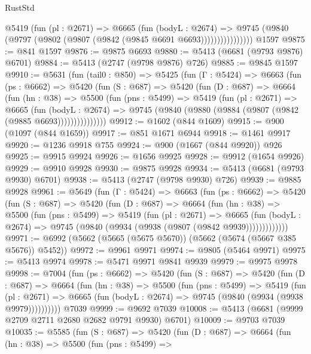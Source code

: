 \begin{lexlean}{RustStd}
\begin{coremodule}
                  @5419
                    (fun (pl : @2671) =>
                    @6665
                      (fun (bodyL : @2674) =>
                      @9745 (@9840 (@9797 (@9802 (@9807 (@9842 (@9845 @6691 @6693))))))))))))))))
    @1597
@9875 := @841 @1597
@9876 := @9875 @6693
@9880 := @5413 (@6681 (@9793 @9876) @6701)
@9884 := @5413 (@2747 (@9798 @9876) @726)
@9885 := @9845 @1597
@9910 := @5631
    (fun (tail0 : @850) =>
    @5425
      (fun (Γ : @5424) =>
      @6663
        (fun (ps : @6662) =>
        @5420
          (fun (S : @687) =>
          @5420
            (fun (D : @687) =>
            @6664
              (fun (hn : @38) =>
              @5500
                (fun (pns : @5499) =>
                @5419
                  (fun (pl : @2671) =>
                  @6665
                    (fun (bodyL : @2674) =>
                    @9745 (@9840 (@9880 (@9884 (@9807 (@9842 (@9885 @6693)))))))))))))))
@9912 := @1602 (@844 @1609)
@9915 := @900 (@1097 (@844 @1659))
@9917 := @851 @1671 @6944
@9918 := @1461 @9917
@9920 := @1236 @9918 @755
@9924 := @900 (@1667 (@844 @9920)) @926
@9925 := @9915 @9924
@9926 := @1656 @9925
@9928 := @9912 (@1654 @9926)
@9929 := @9910 @9928
@9930 := @9875 @9928
@9934 := @5413 (@6681 (@9793 @9930) @6701)
@9938 := @5413 (@2747 (@9798 @9930) @726)
@9939 := @9885 @9928
@9961 := @5649
    (fun (Γ : @5424) =>
    @6663
      (fun (ps : @6662) =>
      @5420
        (fun (S : @687) =>
        @5420
          (fun (D : @687) =>
          @6664
            (fun (hn : @38) =>
            @5500
              (fun (pns : @5499) =>
              @5419
                (fun (pl : @2671) =>
                @6665
                  (fun (bodyL : @2674) =>
                  @9745 (@9840 (@9934 (@9938 (@9807 (@9842 @9939)))))))))))))
@9971 := @6992 (@5662 (@5665 (@5675 @5670)) (@5662 (@5674 (@5667 @385 @5676)) @5452))
@9972 := @9961 @9971
@9974 := @9805 (@5464 @9971)
@9975 := @5413 @9974
@9978 := @5471 @9971 @9841 @9939
@9979 := @9975 @9978
@9998 := @7004
    (fun (ps : @6662) =>
    @5420
      (fun (S : @687) =>
      @5420
        (fun (D : @687) =>
        @6664
          (fun (hn : @38) =>
          @5500
            (fun (pns : @5499) =>
            @5419
              (fun (pl : @2671) =>
              @6665 (fun (bodyL : @2674) => @9745 (@9840 (@9934 (@9938 @9979))))))))))
    @7039
@9999 := @9692 @7039
@10008 := @5413 (@6681 (@9999 @2709 @2711 @2680 @2682 @9791 @9930) @6701)
@10009 := @9703 @7039
@10035 := @5585
    (fun (S : @687) =>
    @5420
      (fun (D : @687) =>
      @6664
        (fun (hn : @38) =>
        @5500
          (fun (pns : @5499) =>

\end{coremodule}
\end{lexlean}
